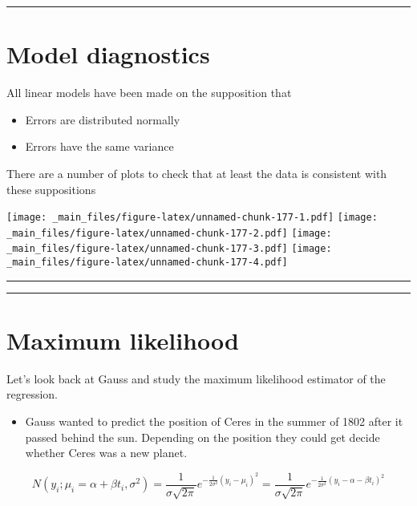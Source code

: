 \documentclass[
]{book}
\providecommand{\tightlist}{%
  \setlength{\itemsep}{0pt}\setlength{\parskip}{0pt}}
\begin{document}
\begin{center}\rule{0.5\linewidth}{0.5pt}\end{center}

\hypertarget{model-diagnostics}{%
\section{Model diagnostics}\label{model-diagnostics}}

All linear models have been made on the supposition that

\begin{itemize}
\item
  Errors are distributed normally
\item
  Errors have the same variance
\end{itemize}

There are a number of plots to check that at least the data is consistent with these suppositions

\texttt{[image: \_main\_files/figure-latex/unnamed-chunk-177-1.pdf]} \texttt{[image: \_main\_files/figure-latex/unnamed-chunk-177-2.pdf]} \texttt{[image: \_main\_files/figure-latex/unnamed-chunk-177-3.pdf]} \texttt{[image: \_main\_files/figure-latex/unnamed-chunk-177-4.pdf]}

\begin{center}\rule{0.5\linewidth}{0.5pt}\end{center}

\begin{center}\rule{0.5\linewidth}{0.5pt}\end{center}

\hypertarget{maximum-likelihood-3}{%
\section{Maximum likelihood}\label{maximum-likelihood-3}}

Let's look back at Gauss and study the maximum likelihood estimator of the regression.

\begin{itemize}
\tightlist
\item
  Gauss wanted to predict the position of Ceres in the summer of 1802 after it passed behind the sun. Depending on the position they could get decide whether Ceres was a new planet.
\end{itemize}

\[N(y_i;\mu_i=\alpha+\beta t_i,\sigma^2)= \frac{1}{\sigma \sqrt{2 \pi}} e^{-\frac{1}{2\sigma^2} (y_i-\mu_i)^2}= \frac{1}{\sigma \sqrt{2 \pi}} e^{-\frac{1}{2\sigma^2} (y_i-\alpha-\beta t_i)^2}\]
\end{document}
